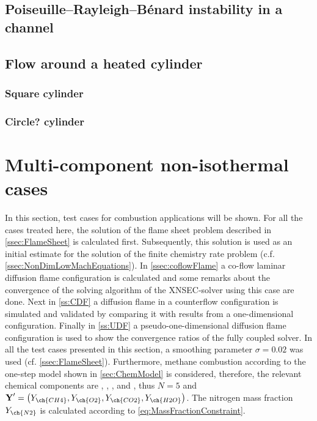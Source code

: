 \subsection{Poiseuille–Rayleigh–Bénard instability in a channel}
\blindtext[5]
\subsection{Flow around a heated cylinder}
\subsubsection{Square cylinder}
\blindtext[5]
\subsubsection{Circle? cylinder}
\blindtext[5]
\section{Multi-component non-isothermal cases}\label{sec:MultCompNonIsothermCase}
In this section, test cases for combustion applications will be shown. For all the cases treated here, the solution of the flame sheet problem described in \cref{ssec:FlameSheet} is calculated first. Subsequently, this solution is used as an initial estimate for the solution of the finite chemistry rate problem (c.f. \cref{ssec:NonDimLowMachEquations}). In \cref{ssec:coflowFlame} a co-flow laminar diffusion flame configuration is calculated and some remarks about the convergence of the solving algorithm of the XNSEC-solver using this case are done. Next in \cref{ss:CDF} a diffusion flame in a counterflow configuration is simulated and validated by comparing it with results from a one-dimensional configuration. Finally in \cref{ss:UDF} a pseudo-one-dimensional diffusion flame configuration is used to show the convergence ratios of the fully coupled solver. In all the test cases presented in this section, a smoothing parameter $\sigma = 0.02$ was used (cf. \cref{ssec:FlameSheet}). Furthermore, methane combustion according to the one-step model shown in \cref{sec:ChemModel} is considered, therefore, the relevant chemical components are , , ,  and , thus $N = 5$ and $\vec{Y}' = \left(Y_{\ch{CH4}},Y_{\ch{O2}},Y_{\ch{CO2}},Y_{\ch{H2O}}\right)$. The nitrogen mass fraction $Y_{\ch{N2}}$ is calculated according to \cref{eq:MassFractionConstraint}.







\FloatBarrier

